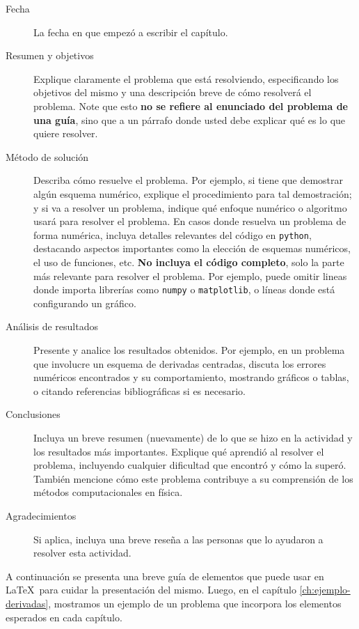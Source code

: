 \documentclass[../portafolio.tex]{subfiles}
\begin{document}
\begin{description}
\item[Fecha] La fecha en que empezó a escribir el capítulo.
\item[Resumen y objetivos] Explique claramente el problema que está resolviendo,
  especificando los objetivos del mismo y una descripción breve de
  cómo resolverá el problema. Note que esto \textbf{no se refiere al
    enunciado del problema de una guía}, sino que a un párrafo donde
  usted debe explicar qué es lo que quiere resolver.
\item[Método de solución] Describa cómo resuelve el problema. Por
  ejemplo, si tiene que demostrar algún esquema numérico, explique el
  procedimiento para tal demostración; y si va a resolver un problema,
  indique qué enfoque numérico o algoritmo usará para resolver el
  problema. En casos donde resuelva un problema de forma numérica,
  incluya detalles relevantes del código en \texttt{python},
  destacando aspectos importantes como la elección de esquemas
  numéricos, el uso de funciones, etc. \textbf{No incluya el código
    completo}, solo la parte más relevante para resolver el
  problema. Por ejemplo, puede omitir lineas donde importa librerías
  como \texttt{numpy} o \texttt{matplotlib}, o líneas donde está
  configurando un gráfico.

\item[Análisis de resultados] Presente y analice los resultados
  obtenidos. Por ejemplo, en un problema que involucre un esquema de
  derivadas centradas, discuta los errores numéricos encontrados y su
  comportamiento, mostrando gráficos o tablas, o citando referencias
  bibliográficas si es necesario.

\item[Conclusiones] Incluya un breve resumen (nuevamente) de lo que se
  hizo en la actividad y los resultados más importantes. Explique qué
  aprendió al resolver el problema, incluyendo cualquier dificultad
  que encontró y cómo la superó. También mencione cómo este problema
  contribuye a su comprensión de los métodos computacionales en
  física.

\item[Agradecimientos] Si aplica, incluya una breve reseña a las
  personas que lo ayudaron a resolver esta actividad.
\end{description}

A continuación se presenta una breve guía de elementos que puede usar en \LaTeX\ para cuidar la presentación del mismo. Luego, en el capítulo \ref{ch:ejemplo-derivadas}, mostramos un ejemplo de un problema que incorpora los elementos esperados en cada capítulo.
\end{document}
